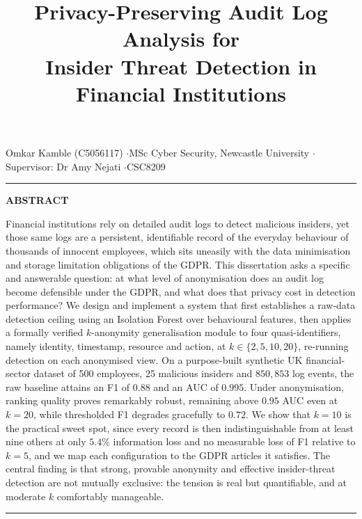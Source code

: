 \documentclass[10pt,a4paper]{article}
\title{\vspace{-1.0em}\bfseries\LARGE Privacy-Preserving Audit Log Analysis for\\ Insider Threat Detection in Financial Institutions\vspace{-0.2em}}
\author{}
\date{}
\begin{document}
\maketitle
\thispagestyle{fancy}
\vspace{-3.2em}
\begin{center}
{\footnotesize Omkar Kamble (C5056117) \quad$\cdot$\quad MSc Cyber Security, Newcastle University \quad$\cdot$\quad Supervisor: Dr Amy Nejati \quad$\cdot$\quad CSC8209}\\[1pt]
\end{center}
\vspace{0.1em}

\noindent\rule{\linewidth}{0.4pt}
\begin{center}\textbf{\small ABSTRACT}\end{center}
\vspace{-0.3em}
{\small\noindent
Financial institutions rely on detailed audit logs to detect malicious insiders, yet those same logs are a persistent, identifiable record of the everyday behaviour of thousands of innocent employees, which sits uneasily with the data minimisation and storage limitation obligations of the GDPR. This dissertation asks a specific and answerable question: at what level of anonymisation does an audit log become defensible under the GDPR, and what does that privacy cost in detection performance? We design and implement a system that first establishes a raw-data detection ceiling using an Isolation Forest over behavioural features, then applies a formally verified $k$-anonymity generalisation module to four quasi-identifiers, namely identity, timestamp, resource and action, at $k \in \{2,5,10,20\}$, re-running detection on each anonymised view. On a purpose-built synthetic UK financial-sector dataset of 500 employees, 25 malicious insiders and $850{,}853$ log events, the raw baseline attains an F1 of $0.88$ and an AUC of $0.995$. Under anonymisation, ranking quality proves remarkably robust, remaining above $0.95$ AUC even at $k=20$, while thresholded F1 degrades gracefully to $0.72$. We show that $k=10$ is the practical sweet spot, since every record is then indistinguishable from at least nine others at only $5.4\%$ information loss and no measurable loss of F1 relative to $k=5$, and we map each configuration to the GDPR articles it satisfies. The central finding is that strong, provable anonymity and effective insider-threat detection are not mutually exclusive: the tension is real but quantifiable, and at moderate $k$ comfortably manageable.}
\vspace{0.4em}
\noindent\rule{\linewidth}{0.4pt}
\end{document}
